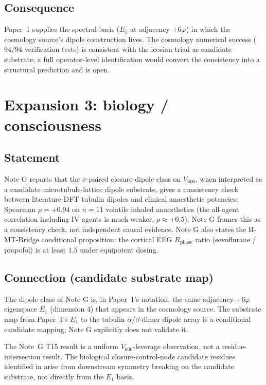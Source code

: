 \documentclass[11pt,a4paper]{article}
\theoremstyle{definition}
\theoremstyle{remark}
\begin{document}
\subsection*{Consequence}

Paper~1 supplies the spectral basis ($E_1$ at adjacency $+6\varphi$) in
which the cosmology source's dipole construction lives. The cosmology
numerical success ($94/94$ verification tests) is consistent with the
icosian triad as candidate substrate; a full operator-level
identification would convert the consistency into a structural prediction
and is open.

\bigskip

\section{Expansion 3: biology / consciousness}\label{sec:biology}

\subsection*{Statement}

Note G \cite{noteG} reports that the $\sigma$-paired closure-dipole
class on $V_{600}$, when interpreted as a candidate microtubule-lattice
dipole substrate, gives a consistency check between
literature-DFT tubulin dipoles and clinical anaesthetic potencies:
Spearman $\rho = +0.94$ on $n = 11$ volatile inhaled anaesthetics (the
all-agent correlation including IV agents is much weaker,
$\rho \approx +0.5$). Note G frames this as a consistency check, not
independent causal evidence. Note G also states the H-MT-Bridge
conditional proposition: the cortical EEG $R_{\mathrm{phase}}$ ratio
(sevoflurane / propofol) is at least $1.5$ under equipotent dosing.

\subsection*{Connection (candidate substrate map)}

The dipole class of Note G is, in Paper~1's notation, the same
adjacency-$+6\varphi$ eigenspace $E_1$ (dimension $4$) that appears in
the cosmology source. The substrate map from Paper~1's $E_1$ to the
tubulin $\alpha$/$\beta$-dimer dipole array is a conditional candidate
mapping; Note G explicitly does not validate it.

The Note~G T15 result is a uniform $V_{600}$-leverage observation, not a
residue-intersection result. The biological closure-control-node
candidate residues identified in \cite{noteG} arise from downstream
symmetry breaking on the candidate substrate, not directly from the
$E_1$ basis.
\end{document}
